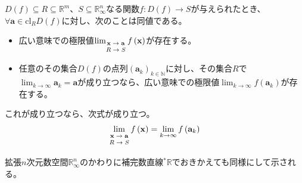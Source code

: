 \documentclass[dvipdfmx]{jsarticle}
\begin{document}
\begin{thm}\label{4.1.10.3}
$D(f) \subseteq R \subseteq \mathbb{R}^{m}$、$S \subseteq \mathbb{R}_{\infty}^{n}$なる関数$f:D(f) \rightarrow S$が与えられたとき、$\forall\mathbf{a} \in \mathrm{cl}_{R}{D(f)}$に対し、次のことは同値である。
\begin{itemize}
\item
  広い意味での極限値$\lim_{\scriptsize \begin{matrix} \mathbf{x} \rightarrow \mathbf{a} \\ R \rightarrow S \\\end{matrix}}{f\left( \mathbf{x} \right)}$が存在する。
\item
  任意のその集合$D(f)$の点列$\left( \mathbf{a}_{k} \right)_{k \in \mathbb{N}}$に対し、その集合$R$で$\lim_{k \rightarrow \infty}\mathbf{a}_{k} = \mathbf{a}$が成り立つなら、広い意味での極限値$\lim_{k \rightarrow \infty}{f\left( \mathbf{a}_{k} \right)}$が存在する。
\end{itemize}
これが成り立つなら、次式が成り立つ。
\begin{align*}
\lim_{\scriptsize \begin{matrix} \mathbf{x} \rightarrow \mathbf{a} \\ R \rightarrow S \\\end{matrix}}{f\left( \mathbf{x} \right)} = \lim_{k \rightarrow \infty}{f\left( \mathbf{a}_{k} \right)}
\end{align*}\par
拡張$n$次元数空間$\mathbb{R}_{\infty}^{n}$のかわりに補完数直線${}^{*}\mathbb{R}$でおきかえても同様にして示される。
\end{thm}
\end{document}
